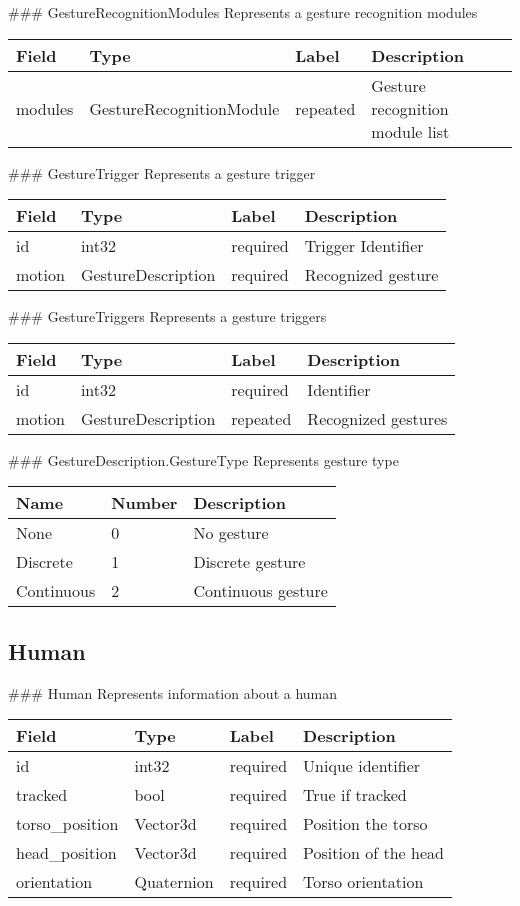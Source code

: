  \#\#\# GestureRecognitionModules Represents a gesture recognition
modules

\begin{longtable}[c]{@{}llll@{}}
\toprule
Field & Type & Label & Description\tabularnewline
\midrule
\endhead
modules & GestureRecognitionModule & repeated & Gesture recognition
module list\tabularnewline
\bottomrule
\end{longtable}

 \#\#\# GestureTrigger Represents a gesture trigger

\begin{longtable}[c]{@{}llll@{}}
\toprule
Field & Type & Label & Description\tabularnewline
\midrule
\endhead
id & int32 & required & Trigger Identifier\tabularnewline
motion & GestureDescription & required & Recognized
gesture\tabularnewline
\bottomrule
\end{longtable}

 \#\#\# GestureTriggers Represents a gesture triggers

\begin{longtable}[c]{@{}llll@{}}
\toprule
Field & Type & Label & Description\tabularnewline
\midrule
\endhead
id & int32 & required & Identifier\tabularnewline
motion & GestureDescription & repeated & Recognized
gestures\tabularnewline
\bottomrule
\end{longtable}

 \#\#\# GestureDescription.GestureType Represents gesture type

\begin{longtable}[c]{@{}lll@{}}
\toprule
Name & Number & Description\tabularnewline
\midrule
\endhead
None & 0 & No gesture\tabularnewline
Discrete & 1 & Discrete gesture\tabularnewline
Continuous & 2 & Continuous gesture\tabularnewline
\bottomrule
\end{longtable}

 \subsection{Human}\label{human.proto}

 \#\#\# Human Represents information about a human

\begin{longtable}[c]{@{}llll@{}}
\toprule
Field & Type & Label & Description\tabularnewline
\midrule
\endhead
id & int32 & required & Unique identifier\tabularnewline
tracked & bool & required & True if tracked\tabularnewline
torso\_position & Vector3d & required & Position the
torso\tabularnewline
head\_position & Vector3d & required & Position of the
head\tabularnewline
orientation & Quaternion & required & Torso orientation\tabularnewline
\bottomrule
\end{longtable}

